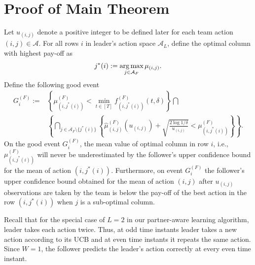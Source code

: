 \documentclass[letterpaper]{article} %
\theoremstyle{definition}
\def\argmax{\mathop{\rm arg\,max}}
\def\mc{\mathcal}
\begin{document}
\section{Proof of Main Theorem}
\label{appendix:main_proof}
Let $u_{(i,j)}$ denote a positive integer to be defined later for each team action $(i,j) \in \mc{A}$. For all rows $i$ in leader's action space $\mc{A}_L$, define the optimal column with highest pay-off as
\begin{align}
    j^{\ast}(i) := \argmax_{j \in \mc{A}_F} \mu_{(i,j)}.
\end{align}
Define the following good event
\begin{align}
    G^{(F)}_{i}
    := & 
    \left\{
    \mu^{(F)}_{(i,j^{\ast}(i))} \!<\! \min_{t \in [T]} f^{(F)}_{(i,j^{\ast}(i))}(t, \delta)
    \right\}\bigcap \\
    & \left\{
    \bigcap_{j \in \mc{A}_F\setminus \{j^{\ast}(i)\}}
    \!\left\{
    \hat{\mu}^{(F)}_{(i, j)}(u_{(i, j)})+ \sqrt{\frac{2\log1/\delta}{u_{(i, j)}}}
    < \mu^{(F)}_{(i,j^{\ast}(i))}
    \right\}\right\}.
\end{align}
On the good event $G^{(F)}_{i}$, the mean value of optimal column in row $i$, i.e., $\mu^{(F)}_{(i, j^{\ast}(i))}$ will never be underestimated by the follower's upper confidence bound for the mean of action $(i, j^{\ast}(i))$. Furthermore, on event $G^{(F)}_{i}$ the follower's upper confidence bound obtained for the mean of action $(i,j)$ after $u_{(i, j)}$ observations are taken by the team is below the pay-off of the best action in the row $(i, j^{\ast}(i))$ when $j$ is a sub-optimal column. 

Recall that for the special case of $L=2$ in our partner-aware learning algorithm, leader takes each action twice. Thus, at odd time instants leader takes a new action according to its UCB and at even time instants it repeats the same action. Since $W = 1$, the follower predicts the leader's action correctly at every even time instant.
\end{document}
